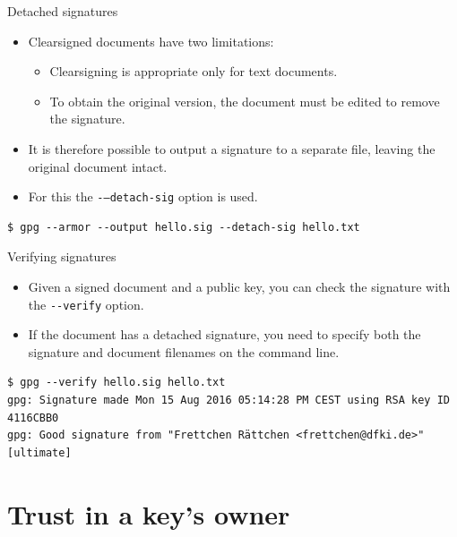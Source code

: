 \documentclass[
mode=present,
paper=smartboard,
size=20pt,
]{powerdot}
\newcommand{\clopt}[1]{\texttt{{-}#1}}
\begin{document}
\makeatletter\renewcommand{\verbatim@font}{\footnotesize\tt}\makeatother
\begin{slide}[method=direct]{Detached signatures}
  \begin{itemize}
  \item Clearsigned documents have two limitations:
    \begin{itemize}
    \item Clearsigning is appropriate only for text documents.
    \item To obtain the original version, the document must be edited
      to remove the signature.
    \end{itemize}
  \item It is therefore possible to output a signature to a separate
    file, leaving the original document intact.
  \item For this the \clopt{--detach-sig} option is used.
  \end{itemize}
\begin{verbatim}
$ gpg --armor --output hello.sig --detach-sig hello.txt
\end{verbatim}
\end{slide}

\begin{slide}[method=direct]{Verifying signatures}
  \begin{itemize}
  \item Given a signed document and a public key, you can check the
    signature with the \clopt{-verify} option.
  \item If the document has a detached signature, you need to specify
    both the signature and document filenames on the command line.
  \end{itemize}
\begin{verbatim}
$ gpg --verify hello.sig hello.txt
gpg: Signature made Mon 15 Aug 2016 05:14:28 PM CEST using RSA key ID 4116CBB0
gpg: Good signature from "Frettchen Rättchen <frettchen@dfki.de>" [ultimate]
\end{verbatim}
\end{slide}

\section{Trust in a key's owner}
\end{document}
